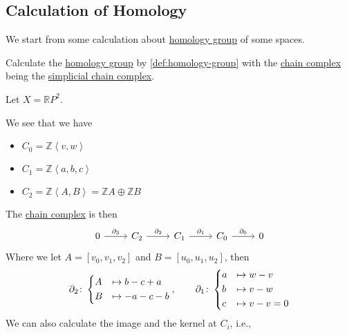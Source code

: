 \subsection{Calculation of Homology}
We start from some calculation about \hyperref[def:homology-group]{homology group} of some spaces.
\begin{eg}
	Calculate the \hyperref[def:homology-group]{homology group} by \autoref{def:homology-group} with the \hyperref[def:chain-complex]{chain complex}
	being the \hyperref[def:simplicial-complex]{simplicial chain complex}.
\end{eg}
\begin{explanation}
	Let \(X = \mathbb{R} P^{2} \).
	\begin{figure}[H]
		\centering
		\label{fig:eg:homology-RP2}
	\end{figure}
	We see that we have
	\begin{itemize}
		\item \(C_0 = \mathbb{Z} \left< v, w \right> \)
		\item \(C_1 = \mathbb{Z} \left< a, b, c \right> \)
		\item \(C_2 = \mathbb{Z} \left< A, B \right> = \mathbb{Z} A \oplus \mathbb{Z} B\)
	\end{itemize}
	The \hyperref[def:chain-complex]{chain complex} is then
	\[
		\begin{tikzcd}
			0 & {C_2} & {C_1} & {C_0} & 0
			\arrow["{\partial_3}", from=1-1, to=1-2]
			\arrow["{\partial_2}", from=1-2, to=1-3]
			\arrow["{\partial_1}", from=1-3, to=1-4]
			\arrow["{\partial_0}", from=1-4, to=1-5]
		\end{tikzcd}
	\]
	Where we let \(A = [v_0, v_1, v_2]\) and \(B = [u_0, u_1, u_2]\), then
	\[
		\partial_2\colon \begin{dcases}
			A & \mapsto b - c + a \\
			B & \mapsto -a-c-b    \\
		\end{dcases},\qquad \partial_1\colon \begin{dcases}
			a & \mapsto w - v     \\
			b & \mapsto v - w     \\
			c & \mapsto v - v = 0 \\
		\end{dcases}
	\]
	We can also calculate the image and the kernel at \(C_{i} \), i.e.,
	\[
		\begin{alignedat}{3}

\end{alignedat}\]
\end{explanation}

